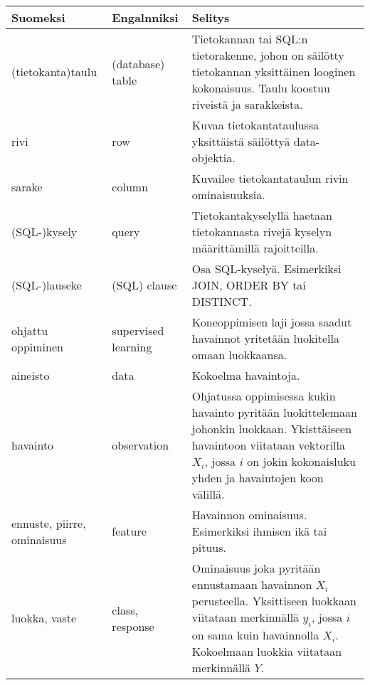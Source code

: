 \documentclass[finnish,twoside,openright]{HYgraduMLDS}
\begin{document}
\begin{center}\label{chapter:termistö}
    \begin{tabular}{|| m{4cm} | m{3cm} | m{8cm} ||} 
        \hline
        Suomeksi                                    & Engalnniksi           &   Selitys \\ [0.5ex] 
        \hline\hline
        (tietokanta)taulu                           & (database) table      & Tietokannan tai SQL:n tietorakenne, johon on säilötty tietokannan yksittäinen looginen kokonaisuus. Taulu koostuu riveistä ja sarakkeista. \\ 
        \hline
        rivi                                        & row                   & Kuvaa tietokantataulussa yksittäistä säilöttyä data-objektia. \\
        \hline
        sarake                                      & column                & Kuvailee tietokantataulun rivin ominaisuuksia. \\
        \hline
        (SQL-)kysely                                      & query                 & Tietokantakyselyllä haetaan tietokannasta rivejä kyselyn määrittämillä rajoitteilla. \\
        \hline
        (SQL-)lauseke                               & (SQL) clause          & Osa SQL-kyselyä. Esimerkiksi JOIN, ORDER BY tai DISTINCT. \\ [1ex] 
        \hline
        ohjattu oppiminen \label{term:supervised}   & supervised learning   & Koneoppimisen laji jossa saadut havainnot yritetään luokitella omaan luokkaansa. \\
        \hline
        aineisto                                    & data                  & Kokoelma havaintoja. \\
        \hline
        havainto                                    & observation           & Ohjatussa oppimisessa kukin havainto pyritään luokittelemaan johonkin luokkaan. Ykisttäiseen havaintoon viitataan vektorilla $X_i$, jossa $i$ on jokin kokonaisluku yhden ja havaintojen koon välillä. \\
        \hline
        ennuste, piirre, ominaisuus                 & feature               & Havainnon ominaisuus. Esimerkiksi ihmisen ikä tai pituus. \\
        \hline
        luokka, vaste                               & class, response       & Ominaisuus joka pyritään ennustamaan havainnon $X_i$ perusteella. Yksittiseen luokkaan viitataan merkinnällä $y_i$, jossa $i$ on sama kuin havainnolla $X_i$. Kokoelmaan luokkia viitataan merkinnällä $Y$. \\
        \hline
    \end{tabular}
\end{center}
\end{document}
